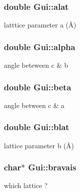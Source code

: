 \subsubsection[{alat}]{\setlength{\rightskip}{0pt plus 5cm}double Gui\+::alat}\label{class_gui_a1f0bf13bd26f8dbb3756f4475d50ea3b}


latttice parameter a (Å) 

\hypertarget{class_gui_af21a8a5ef3954775896ef3ebc4f12ec5}{}
\subsubsection[{alpha}]{\setlength{\rightskip}{0pt plus 5cm}double Gui\+::alpha}\label{class_gui_af21a8a5ef3954775896ef3ebc4f12ec5}


angle beteween c \& b 

\hypertarget{class_gui_a2b89466ec45a283f6d7b94b6ffc36640}{}
\subsubsection[{beta}]{\setlength{\rightskip}{0pt plus 5cm}double Gui\+::beta}\label{class_gui_a2b89466ec45a283f6d7b94b6ffc36640}


angle between c \& a 

\hypertarget{class_gui_a2bf9af74005d7da17b63c00328831fd3}{}
\subsubsection[{blat}]{\setlength{\rightskip}{0pt plus 5cm}double Gui\+::blat}\label{class_gui_a2bf9af74005d7da17b63c00328831fd3}


lattice parameter b (Å) 

\hypertarget{class_gui_afeba585e007765820c01f71e7b5f7c87}{}
\subsubsection[{bravais}]{\setlength{\rightskip}{0pt plus 5cm}char$\ast$ Gui\+::bravais}\label{class_gui_afeba585e007765820c01f71e7b5f7c87}


which lattice ? 

\hypertarget{class_gui_ac92e0603324d6b978d1813d0d0c2bef9}{}
